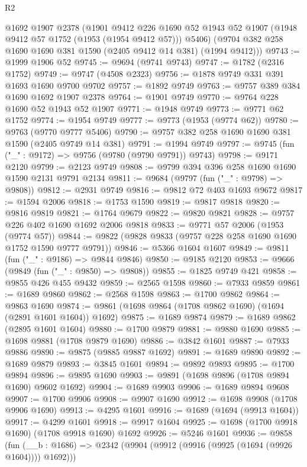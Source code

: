 \begin{lexlean}{R2}
\begin{coremodule}
      @1692
      @1907
      @2378
      (@1901
        @9412
        @226
        @1690
        @52
        @1943
        @52
        @1907
        (@1948 @9412 @57 @1752 (@1953 (@1954 @9412 @57)))
        @5406)
      (@9704 @382 @258 @1690 @1690 @381 @1590 (@2405 @9412 @14 @381) (@1994 @9412)))
@9743 := @1999 @1906 @52
@9745 := @9694 (@9741 @9743)
@9747 := @1782 (@2316 @1752)
@9749 := @9747 (@4508 @2323)
@9756 := @1878 @9749 @331 @391 @1693 @1690 @9700 @9702
@9757 := @1892 @9749
@9763 := @9757 @389 @384 @1690 @1692 @1907 @2378
@9764 := @1901 @9749
@9770 := @9764 @228 @1690 @52 @1943 @52 @1907
@9771 := @1948 @9749
@9773 := @9771 @62 @1752
@9774 := @1954 @9749
@9777 := @9773 (@1953 (@9774 @62))
@9780 := @9763 (@9770 @9777 @5406)
@9790 := @9757 @382 @258 @1690 @1690 @381 @1590 (@2405 @9749 @14 @381)
@9791 := @1994 @9749
@9797 := @9745 (fun ("_" : @9172) => @9756 (@9780 (@9790 @9791)) @9743)
@9798 := @9171 @2120
@9799 := @2123 @9749
@9808 := @9799 @394 @396 @258 @1690 @1690 @1590 @2131 @9791 @2134
@9811 := @9684 (@9797 (fun ("_" : @9798) => @9808))
@9812 := @2931 @9749
@9816 := @9812 @72 @403 @1693 @9672
@9817 := @1594 @2006
@9818 := @1753 @1590
@9819 := @9817 @9818
@9820 := @9816 @9819
@9821 := @1764 @9679
@9822 := @9820 @9821
@9828 := @9757 @226 @402 @1690 @1692 @2006 @9818
@9833 := @9771 @57 @2006 (@1953 (@9774 @57))
@9844 := @9822 (@9828 @9833 (@9757 @228 @258 @1690 @1690 @1752 @1590 @9777 @9791))
@9846 := @5366 @1604 @1607
@9849 := @9811 (fun ("_" : @9186) => @9844 @9846)
@9850 := @9185 @2120
@9853 := @9666 (@9849 (fun ("_" : @9850) => @9808))
@9855 := @1825 @9749 @421
@9858 := @9855 @426 @455 @9432
@9859 := @2565 @1598
@9860 := @7933 @9859
@9861 := @1689 @9860
@9862 := @2568 @1598
@9863 := @1700 @9862
@9864 := @9863 @1690
@9874 := @9861 (@1698 @9864 (@1708 @9862 @1690) (@1694 (@2891 @1601 @1604)) @1692)
@9875 := @1689 @9874
@9879 := @1689 @9862 (@2895 @1601 @1604)
@9880 := @1700 @9879
@9881 := @9880 @1690
@9885 := @1698 @9881 (@1708 @9879 @1690)
@9886 := @3842 @1601
@9887 := @7933 @9886
@9890 := @9875 (@9885 @9887 @1692)
@9891 := @1689 @9890
@9892 := @1689 @9879
@9893 := @3845 @1601
@9894 := @9892 @9893
@9895 := @1700 @9894
@9896 := @9895 @1690
@9903 := @9891 (@1698 @9896 (@1708 @9894 @1690) @9602 @1692)
@9904 := @1689 @9903
@9906 := @1689 @9894 @9608
@9907 := @1700 @9906
@9908 := @9907 @1690
@9912 := @1698 @9908 (@1708 @9906 @1690)
@9913 := @4295 @1601
@9916 := @1689 (@1694 (@9913 @1604))
@9917 := @4299 @1601
@9918 := @9917 @1604
@9925 := @1698 (@1700 @9918 @1690) (@1708 @9918 @1690) @1692
@9926 := @5246 @1601
@9936 := @9858
    (fun (__b : @1686) => @2342 (@9904 (@9912 (@9916 (@9925 (@1694 (@9926 @1604)))) @1692)))

\end{coremodule}
\end{lexlean}
